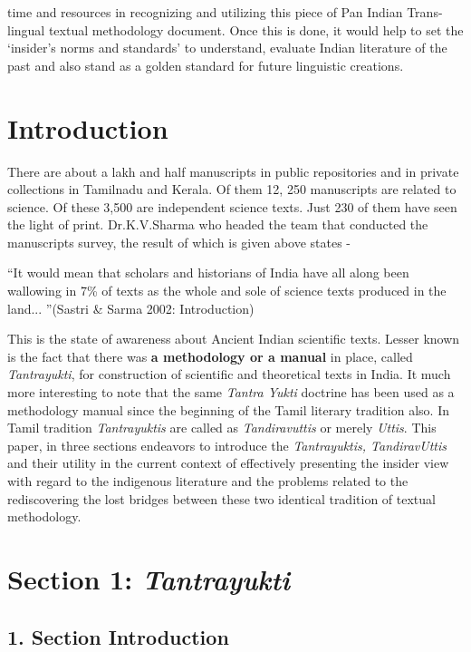 time and resources in recognizing and utilizing this piece of Pan Indian Trans-lingual textual methodology document. Once this is done, it would help to set the ‘insider’s norms and standards’ to understand, evaluate Indian literature of the past and also stand as a golden standard for future linguistic creations.


\section*{Introduction}

There are about a lakh and half manuscripts in public repositories and in private collections in Tamilnadu and Kerala. Of them 12, 250 manuscripts are related to science. Of these 3,500 are independent science texts. Just 230 of them have seen the light of print. Dr.K.V.Sharma who headed the team that conducted the manuscripts survey, the result of which is given above states -

“It would mean that scholars and historians of India have all along been wallowing in 7\% of texts as the whole and sole of science texts produced in the land... ”\hfill (Sastri \& Sarma 2002: Introduction)

This is the state of awareness about Ancient Indian scientific texts. Lesser known is the fact that there was \textbf{a methodology or a manual} in place, called \textit{Tantrayukti}, for construction of scientific and theoretical texts in India. It much more interesting to note that the same \textit{Tantra Yukti} doctrine has been used as a methodology manual since the beginning of the Tamil literary tradition also. In Tamil tradition \textit{Tantrayuktis} are called as \textit{Tandiravuttis} or merely \textit{Uttis}. This paper, in three sections endeavors to introduce the \textit{Tantrayuktis, TandiravUttis} and their utility in the current context of effectively presenting the insider view with regard to the indigenous literature and the problems related to the rediscovering the lost bridges between these two identical tradition of textual methodology.


\section*{Section 1: \textit{Tantrayukti}}

\subsection*{1. Section Introduction }

